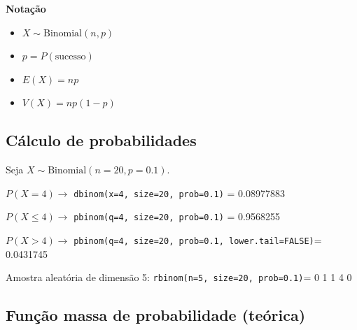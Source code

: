 \documentclass[
]{book}
\newenvironment{Shaded}{\begin{snugshade}}{\end{snugshade}}
\newcommand{\AttributeTok}[1]{\textcolor[rgb]{0.13,0.29,0.53}{#1}}
\newcommand{\CommentTok}[1]{\textcolor[rgb]{0.56,0.35,0.01}{\textit{#1}}}
\newcommand{\ConstantTok}[1]{\textcolor[rgb]{0.56,0.35,0.01}{#1}}
\newcommand{\DecValTok}[1]{\textcolor[rgb]{0.00,0.00,0.81}{#1}}
\newcommand{\FloatTok}[1]{\textcolor[rgb]{0.00,0.00,0.81}{#1}}
\newcommand{\FunctionTok}[1]{\textcolor[rgb]{0.13,0.29,0.53}{\textbf{#1}}}
\newcommand{\NormalTok}[1]{#1}
\newcommand{\OtherTok}[1]{\textcolor[rgb]{0.56,0.35,0.01}{#1}}
\newcommand{\SpecialCharTok}[1]{\textcolor[rgb]{0.81,0.36,0.00}{\textbf{#1}}}
\newcommand{\StringTok}[1]{\textcolor[rgb]{0.31,0.60,0.02}{#1}}
\providecommand{\tightlist}{%
  \setlength{\itemsep}{0pt}\setlength{\parskip}{0pt}}
\begin{document}
\textbf{Notação}

\begin{itemize}
\tightlist
\item
  \(X \sim \text{Binomial}(n,p)\)
\item
  \(p = P(\text{sucesso})\)
\item
  \(E(X) = np\)
\item
  \(V(X) = np(1-p)\)
\end{itemize}

\subsection{Cálculo de probabilidades}\label{cuxe1lculo-de-probabilidades-1}

Seja \(X\sim\text{Binomial}(n=20, p=0.1)\).

\(P(X = 4) \to\) \texttt{dbinom(x=4,\ size=20,\ prob=0.1)} = 0.08977883

\noindent \(P(X\leq 4) \to\) \texttt{pbinom(q=4,\ size=20,\ prob=0.1)} = 0.9568255

\noindent \(P(X > 4)\to\)
\texttt{pbinom(q=4,\ size=20,\ prob=0.1,\ lower.tail=FALSE)}= 0.0431745

\noindent Amostra aleatória de dimensão 5: \texttt{rbinom(n=5,\ size=20,\ prob=0.1)}= 0 1 1 4 0

\subsection{Função massa de probabilidade (teórica)}\label{funuxe7uxe3o-massa-de-probabilidade-teuxf3rica}

\begin{Shaded}
\end{Shaded}
\end{document}
